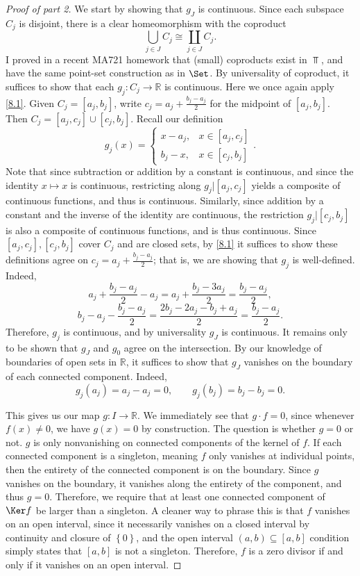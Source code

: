 \documentclass[11pt, letterpaper]{article}
\theoremstyle{plain}
\begin{document}
\begin{proof}[Proof of part 2]
	We start by showing that $g_J$ is continuous. Since each subspace $C_j$ is disjoint, there is a clear homeomorphism with the coproduct
	\[
		\bigcup_{j\in J} C_j \cong \coprod_{j\in J} C_j
	.\]
	I proved in a recent MA721 homework that (small) coproducts exist in $\Top $, and have the same point-set construction as in $\Set $. By universality of coproduct, it suffices to show that each $g_j : C_j \to \mathbb{R} $ is continuous. Here we once again apply \cref{8.1}. Given $C_j=[a_j,b_j]$, write $c_j=a_j+\frac{b_j-a_j}{2} $ for the midpoint of $[a_j,b_j]$. Then $C_j=[a_j,c_j]\cup [c_j,b_j]$. Recall our definition
	\[
		g_j(x)=
		\begin{cases}
			x-a_j,&x\in[a_j,c_j]\\
			b_j-x,&x\in[c_j,b_j]
		\end{cases}
	.\]
	Note that since subtraction or addition by a constant is continuous, and since the identity $x\mapsto x$ is continuous, restricting along $g_j|[a_j,c_j]$ yields a composite of continuous functions, and thus is continuous. Similarly, since addition by a constant and the inverse of the identity are continuous, the restriction $g_j|[c_j,b_j]$ is also a composite of continuous functions, and is thus continuous. Since $[a_j,c_j],[c_j,b_j]$ cover $C_j$ and are closed sets, by \cref{8.1} it suffices to show these definitions agree on $c_j=a_j+\frac{b_j-a_j}{2} $; that is, we are showing that $g_j$ is well-defined. Indeed,
	\[
		a_j+\frac{b_j-a_j}{2} -a_j = a_j+\frac{b_j-3a_j}{2} =\frac{b_j-a_j}{2},
	\]
	\[
		b_j-a_j-\frac{b_j-a_j}{2} =\frac{2b_j-2a_j-b_j+a_j}{2} =\frac{b_j-a_j}{2}
	.\]
	Therefore, $g_j$ is continuous, and by universality $g_J$ is continuous. It remains only to be shown that $g_J$ and $g_0$ agree on the intersection. By our knowledge of boundaries of open sets in $\mathbb{R} $, it suffices to show that $g_J$ vanishes on the boundary of each connected component. Indeed,
	\[
		g_j(a_j)=a_j-a_j=0,\qquad g_j(b_j)=b_j-b_j=0
	.\]

	This gives us our map $g : I \to \mathbb{R} $. We immediately see that $g\cdot f=0$, since whenever $f(x)\neq 0$, we have $g(x)=0$ by construction. The question is whether $g=0$ or not. $g$ is only nonvanishing on connected components of the kernel of $f$. If each connected component is a singleton, meaning $f$ only vanishes at individual points, then the entirety of the connected component is on the boundary. Since $g$ vanishes on the boundary, it vanishes along the entirety of the component, and thus $g=0$. Therefore, we require that at least one connected component of $\Ker f$ be larger than a singleton. A cleaner way to phrase this is that $f$ vanishes on an open interval, since it necessarily vanishes on a closed interval by continuity and closure of $\left\{ 0 \right\} $, and the open interval $(a,b)\subseteq [a,b]$ condition simply states that $[a,b]$ is not a singleton. Therefore, $f$ is a zero divisor if and only if it vanishes on an open interval.
\end{proof}
\end{document}
